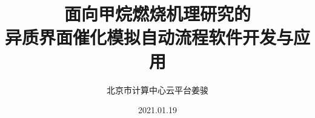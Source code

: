 \documentclass[cjk,slidestop,compress,mathserif,blue]{beamer}
\begin{document}

\title{面向甲烷燃烧机理研究的\\异质界面催化模拟自动流程软件开发与应用}

\author[]{北京市计算中心\;云平台\:姜骏}
	
\institute[]{}
\date{\textrm{2021.01.19}}
\frame
{	
\titlepage
}

\section*{}
%
\small
\end{document}
